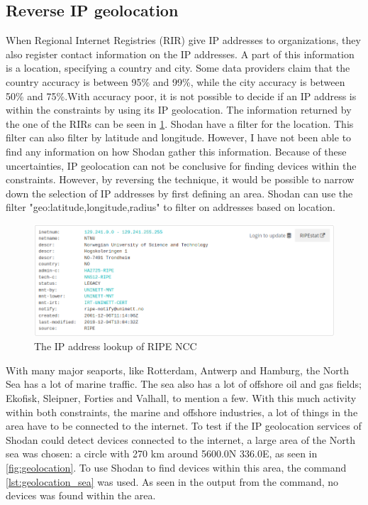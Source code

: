 \subsection{Reverse IP geolocation}
When Regional Internet Registries (RIR) give IP addresses to organizations, they also register contact information on the IP addresses. A part of this information is a location, specifying a country and city. Some data providers claim that the country accuracy is between 95\% and 99\%, while the city accuracy is between 50\% and 75\%.\cite{geolocation_acc}With accuracy poor, it is not possible to decide if an IP address is within the constraints by using its IP geolocation. The information returned by the one of the RIRs can be seen in \cref{fig:RIPE_NCC}.
Shodan have a filter for the location. This filter can also filter by latitude and longitude. However, I have not been able to find any information on how Shodan gather this information.  
Because of these uncertainties, IP geolocation can not be conclusive for finding devices within the constraints. However, by reversing the technique, it would be possible to narrow down the selection of IP addresses by first defining an area. Shodan can use the filter "geo:latitude,longitude,radius" to filter on addresses based on location.  

\begin{figure} [H]
    \centering
    \includegraphics[scale=0.5]{Figurer/ripe.png}
    \caption{The IP address lookup of RIPE NCC \cite{ripe_whois}}
    \label{fig:RIPE_NCC}
\end{figure}

With many major seaports, like Rotterdam, Antwerp and Hamburg, the North Sea has a lot of marine traffic. The sea also has a lot of offshore oil and gas fields; Ekofisk, Sleipner, Forties and Valhall, to mention a few.\cite{oil_field_lists} With this much activity within both constraints, the marine and offshore industries, a lot of things in the area have to be connected to the internet. To test if the IP geolocation services of Shodan could detect devices connected to the internet, a large area of the North sea was chosen: a circle with 270 km around 56\textquotesingle00.0N 3\textquotesingle36.0E, as seen in \cref{fig:geolocation}. To use Shodan to find devices within this area, the command \cref{lst:geolocation_sea} was used. As seen in the output from the command, no devices was found within the area.

